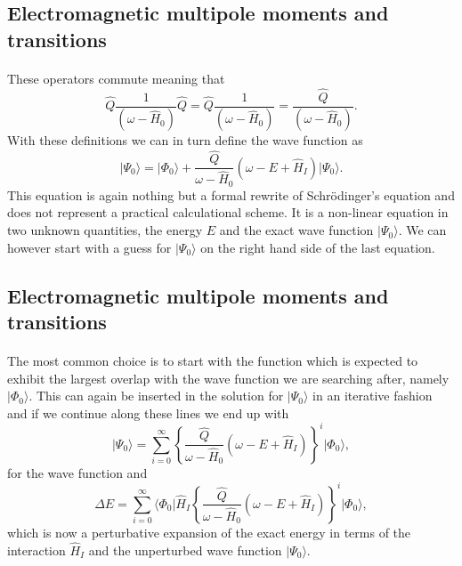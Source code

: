 \documentclass[%
oneside,                 %
final,                   %
10pt]{article}
\begin{document}
\subsection{Electromagnetic multipole moments and transitions}

\paragraph{}
These operators commute meaning that
\[
\hat{Q}\frac{1}{\left(\omega-\hat{H}_0\right)}\hat{Q}=\hat{Q}\frac{1}{\left(\omega-\hat{H}_0\right)}=\frac{\hat{Q}}{\left(\omega-\hat{H}_0\right)}.
\]
With these definitions we can in turn define the wave function as 
\[
\vert \Psi_0\rangle=\vert \Phi_0\rangle+\frac{\hat{Q}}{\omega-\hat{H}_0}\left(\omega-E+\hat{H}_I\right)\vert \Psi_0\rangle.
\]
This equation is again nothing but a formal rewrite of Schr\"odinger's equation
and does not represent a practical calculational scheme.  
It is a non-linear equation in two unknown quantities, the energy $E$ and the exact
wave function $\vert \Psi_0\rangle$. We can however start with a guess for $\vert \Psi_0\rangle$ on the right hand side of the last equation.



\subsection{Electromagnetic multipole moments and transitions}

\paragraph{}
 The most common choice is to start with the function which is expected to exhibit the largest overlap with the wave function we are searching after, namely $\vert \Phi_0\rangle$. This can again be inserted in the solution for $\vert \Psi_0\rangle$ in an iterative fashion and if we continue along these lines we end up with
\[
\vert \Psi_0\rangle=\sum_{i=0}^{\infty}\left\{\frac{\hat{Q}}{\omega-\hat{H}_0}\left(\omega-E+\hat{H}_I\right)\right\}^i\vert \Phi_0\rangle, 
\]
for the wave function and
\[
\Delta E=\sum_{i=0}^{\infty}\langle \Phi_0\vert \hat{H}_I\left\{\frac{\hat{Q}}{\omega-\hat{H}_0}\left(\omega-E+\hat{H}_I\right)\right\}^i\vert \Phi_0\rangle, 
\]
which is now  a perturbative expansion of the exact energy in terms of the interaction
$\hat{H}_I$ and the unperturbed wave function $\vert \Psi_0\rangle$.
\end{document}
